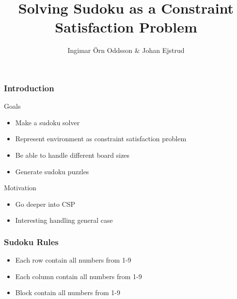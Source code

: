 \documentclass{beamer}
\title{Solving Sudoku as a Constraint Satisfaction Problem}
\author{Ingimar Örn Oddsson \& Johan Ejstrud}
\newcounter{row}
\newcounter{col}
\newcommand\setrow[9]{
    \setcounter{col}{1}
    \foreach \n in {#1, #2, #3, #4, #5, #6, #7, #8, #9} {
        \edef\x{\value{col} - 0.5}
        \edef\y{9.5 - \value{row}}
        \node[digit,name={\arabic{row}-\arabic{col}}] at (\x, \y) {\n};
        \stepcounter{col}
    }
    \stepcounter{row}
}
\begin{document}
\begin{frame}
  \titlepage
\end{frame}

\begin{frame}
  \frametitle{Introduction}
  \begin{block}{Goals}
    \begin{itemize}
    \item Make a sudoku solver 
    \item Represent environment as constraint satisfaction problem
    \item Be able to handle different board sizes 
    \item Generate sudoku puzzles 
    \end{itemize}
  \end{block}

  \begin{block}{Motivation}
    \begin{itemize}
    \item Go deeper into CSP 
    \item Interesting handling general case  
    \end{itemize}
  \end{block}
\end{frame}

\begin{frame}
  \frametitle{Sudoku Rules}
    \begin{itemize}
    \item Each row contain all numbers from 1-9
    \item Each column contain all numbers from 1-9
    \item Block contain all numbers from 1-9
    \end{itemize}
  \begin{figure}
    \centering
  \end{figure}
\end{frame}
\end{document}
